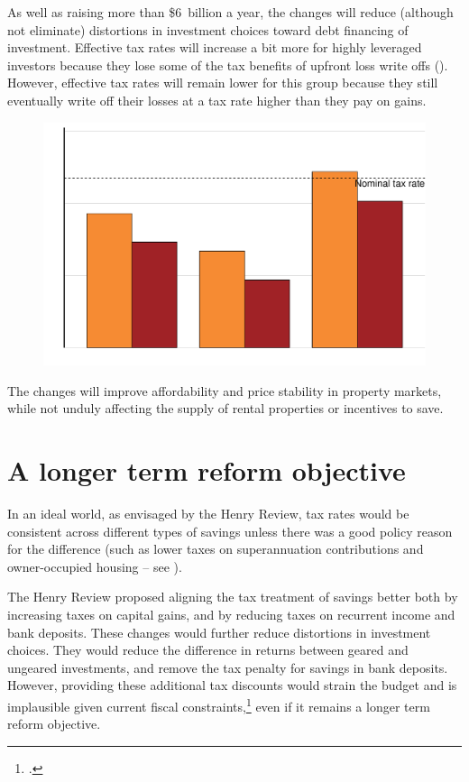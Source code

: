 As well as raising more than \$6~billion a year, the changes will reduce (although not eliminate) distortions in investment choices toward debt financing of investment. Effective tax rates will increase a bit more for highly leveraged investors because they lose some of the tax benefits of upfront loss write offs (). However, effective tax rates will remain lower for this group because they still eventually write off their losses at a tax rate higher than they pay on gains.  
\begin{figure}
\label{fig:16}
\includegraphics[width=\columnwidth]{CGT-NG-atlas/Figure16-R.pdf}
\end{figure}
The changes will improve affordability and price stability in property markets, while not unduly affecting the supply of rental properties or incentives to save.

\section{A longer term reform objective}\label{sec:A-longer-term-reform-objective}
In an ideal world, as envisaged by the Henry Review, tax rates would be consistent across different types of savings unless there was a good policy reason for the difference (such as lower taxes on superannuation contributions and owner-occupied housing – see ). 

The Henry Review proposed aligning the tax treatment of savings better both by increasing taxes on capital gains, and by reducing taxes on recurrent income and bank deposits. These changes would further reduce distortions in investment choices. They would reduce the difference in returns between geared and ungeared investments, and remove the tax penalty for savings in bank deposits. However, providing these additional tax discounts would strain the budget and is implausible given current fiscal constraints,\footcites{Daley2015} even if it remains a longer term reform objective.

